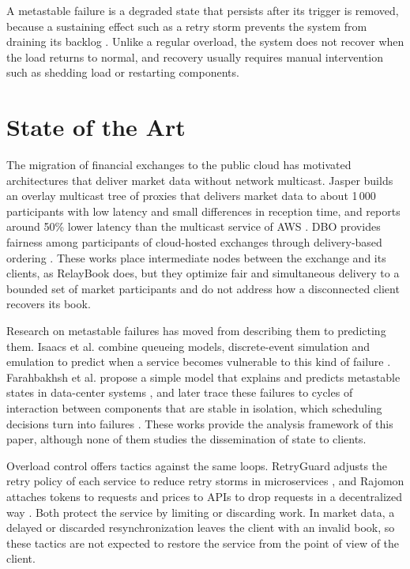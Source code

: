 \documentclass[conference]{IEEEtran}
\begin{document}
A metastable failure is a degraded state that persists after its trigger is removed, because a sustaining effect such as a retry storm prevents the system from draining its backlog \cite{isaacs2025}. Unlike a regular overload, the system does not recover when the load returns to normal, and recovery usually requires manual intervention such as shedding load or restarting components.

\section{State of the Art}
\label{sec:sota}

The migration of financial exchanges to the public cloud has motivated architectures that deliver market data without network multicast. Jasper builds an overlay multicast tree of proxies that delivers market data to about 1\,000 participants with low latency and small differences in reception time, and reports around 50\% lower latency than the multicast service of AWS \cite{onyx2024}. DBO provides fairness among participants of cloud-hosted exchanges through delivery-based ordering \cite{dbo2023}. These works place intermediate nodes between the exchange and its clients, as RelayBook does, but they optimize fair and simultaneous delivery to a bounded set of market participants and do not address how a disconnected client recovers its book.

Research on metastable failures has moved from describing them to predicting them. Isaacs et al. combine queueing models, discrete-event simulation and emulation to predict when a service becomes vulnerable to this kind of failure \cite{isaacs2025}. Farahbakhsh et al. propose a simple model that explains and predicts metastable states in data-center systems \cite{farahbakhsh2025}, and later trace these failures to cycles of interaction between components that are stable in isolation, which scheduling decisions turn into failures \cite{characterizing2026}. These works provide the analysis framework of this paper, although none of them studies the dissemination of state to clients.

Overload control offers tactics against the same loops. RetryGuard adjusts the retry policy of each service to reduce retry storms in microservices \cite{retryguard2025}, and Rajomon attaches tokens to requests and prices to APIs to drop requests in a decentralized way \cite{rajomon2025}. Both protect the service by limiting or discarding work. In market data, a delayed or discarded resynchronization leaves the client with an invalid book, so these tactics are not expected to restore the service from the point of view of the client.
\end{document}
